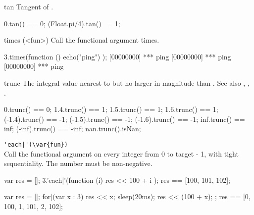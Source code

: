 \begin{urbiscriptapi}
\item[tan]%
  Tangent of \this.
\begin{urbiassert}
0.tan() == 0;
(Float.pi/4).tan() ~= 1;
\end{urbiassert}


\item[times](<fun>)%
  Call the functional argument  \this times.

\begin{urbiscript}
3.times(function () { echo("ping") });
[00000000] *** ping
[00000000] *** ping
[00000000] *** ping
\end{urbiscript}


\item[trunc]%
  The integral value nearest to but no larger in magnitude than \this.  See
  also , , .
\begin{urbiassert}
     0.trunc() ==  0;
   1.4.trunc() ==  1;     1.5.trunc() ==  1;    1.6.trunc() ==  1;
(-1.4).trunc() == -1;  (-1.5).trunc() == -1; (-1.6).trunc() == -1;
   inf.trunc() == inf; (-inf).trunc() == -inf;
   nan.trunc().isNan;
\end{urbiassert}


\item \lstinline='each|'(\var{fun})=\\%
  Call the functional argument  on every integer from 0 to
  target - 1, with tight sequentiality.  The number must be
  non-negative.
\begin{urbiassert}
{
  var res = [];
  3.'each|'(function (i) { res << 100 + i });
  res
}
== [100, 101, 102];

{
  var res = [];
  for|(var x : 3) { res << x; sleep(20ms); res << (100 + x); };
  res
}
== [0, 100, 1, 101, 2, 102];
\end{urbiassert}%
\end{urbiscriptapi}

